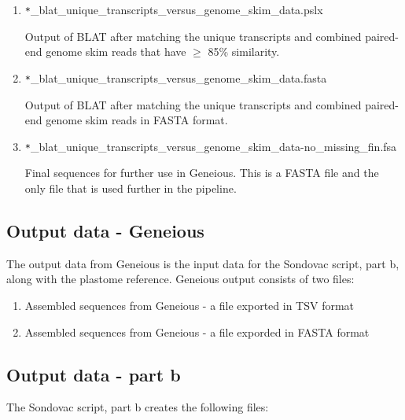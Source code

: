 \begin{enumerate}
\item \verb_*_\_blat\_unique\_transcripts\_versus\_genome\_skim\_data.pslx

Output of BLAT after matching the unique transcripts and combined paired-end genome skim reads that have $\geq$ 85\% similarity. 

\item \verb_*_\_blat\_unique\_transcripts\_versus\_genome\_skim\_data.fasta

Output of BLAT after matching the unique transcripts and combined paired-end genome skim reads in FASTA format. 

\item \verb_*_\_blat\_unique\_transcripts\_versus\_genome\_skim\_data-no\_missing\_fin.fsa

Final sequences for further use in Geneious. This is a FASTA file and the only file that is used further in the pipeline. 


\end{enumerate}

\subsection{Output data - Geneious}

The output data from Geneious is the input data for the Sondovac script, part b, along with the plastome reference. 
Geneious output consists of two files: 
\begin{enumerate}
\item Assembled sequences from Geneious - a file exported in TSV format
\item Assembled sequences from Geneious - a file exporded in FASTA format
\end{enumerate}

\subsection{Output data - part b}

The Sondovac script, part b creates the following files: 

